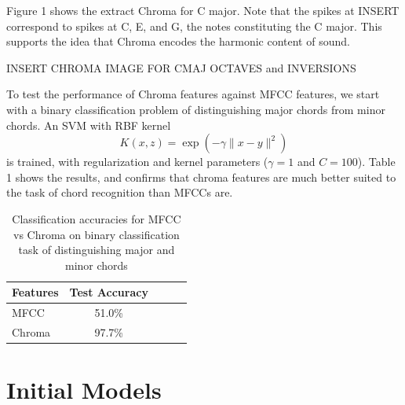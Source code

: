 \documentclass{article}
\begin{document}
Figure 1 shows the extract Chroma for C major. Note that the spikes at INSERT correspond to spikes at C, E, and G, the notes constituting the C major. This supports the idea that Chroma encodes the harmonic content of sound.

INSERT CHROMA IMAGE FOR CMAJ OCTAVES and INVERSIONS

To test the performance of Chroma features against MFCC features, we start with a binary classification problem of distinguishing major chords from minor chords. An SVM with RBF kernel $$ K(x, z) = \exp(-\gamma\lVert{x - y}\rVert^2)$$ is trained, with regularization and kernel parameters ($\gamma = 1$ and $C = 100$). Table 1 shows the results, and confirms that chroma features are much better suited to the task of chord recognition than MFCCs are.
\begin{table}[t]
\caption{Classification accuracies for MFCC vs Chroma on binary classification task of distinguishing major and minor chords}
\label{mfccvschroma}
\vskip 0.15in
\begin{center}
\begin{small}
\begin{sc}
\begin{tabular}{lcccr}
\hline
\abovespace\belowspace
Features & Test Accuracy \\
\hline
\abovespace
MFCC    & 51.0\%\\
Chroma & 97.7\%\\
\hline
\end{tabular}
\end{sc}
\end{small}
\end{center}
\vskip -0.1in
\end{table}

\section{Initial Models}
\end{document}
